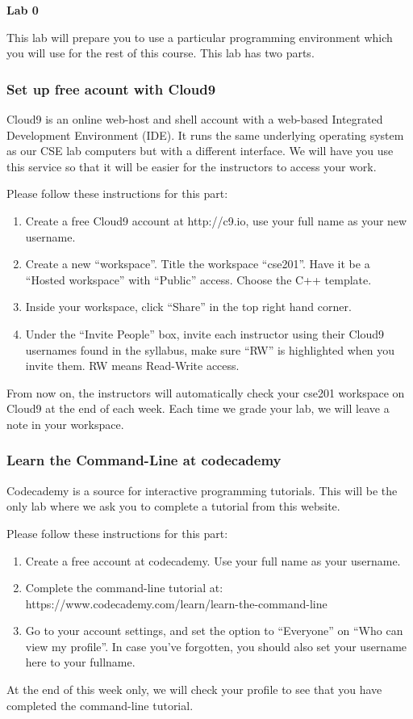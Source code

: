 \documentclass[a4paper,12pt]{article}
\begin{document}
{\centering \Large \bf
Lab 0 \\[\baselineskip]
}

This lab will prepare you to use a particular programming environment which you will use for the rest of this course. This lab has two parts.

\subsubsection*{Set up free acount with Cloud9}

Cloud9 is an online web-host and shell account with a web-based Integrated Development Environment (IDE). It runs the same underlying operating system as our CSE lab computers but with a different interface. We will have you use this service so that it will be easier for the instructors to access your work. 

Please follow these instructions for this part:
\begin{enumerate}
\item Create a free Cloud9 account at http://c9.io, use your full name as your new username.
\item Create a new ``workspace''. Title the workspace ``cse201''. Have it be a ``Hosted workspace'' with ``Public'' access. 
Choose the C++ template.
\item Inside your workspace, click ``Share'' in the top right hand corner. 
\item Under the ``Invite People'' box, invite each instructor using their Cloud9 usernames found in the syllabus, make sure ``RW'' is highlighted when you invite them. RW means Read-Write access.
\end{enumerate}

From now on, the instructors will automatically check your cse201 workspace on Cloud9 at the end of each week. Each time we grade your lab, we will leave a note in your workspace.

\subsubsection*{Learn the Command-Line at codecademy}

Codecademy is a source for interactive programming tutorials. This will be the only lab where we ask you to complete a tutorial from this website. 

Please follow these instructions for this part:
\begin{enumerate}
\item Create a free account at codecademy. Use your full name as your username. 
\item Complete the command-line tutorial at: https://www.codecademy.com/learn/learn-the-command-line
\item Go to your account settings, and set the option to ``Everyone'' on ``Who can view my profile''. In case you've forgotten, you should also set your username here to your fullname.
\end{enumerate}

At the end of this week only, we will check your profile to see that you have completed the command-line tutorial.
\end{document}
